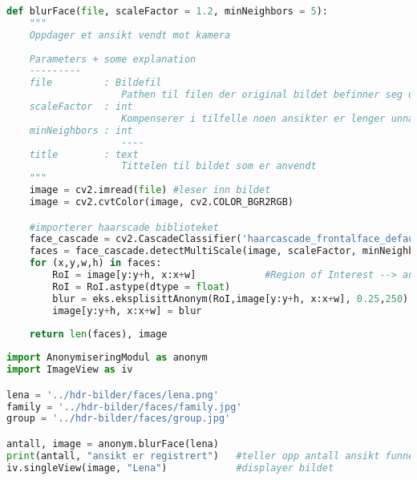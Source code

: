 \begin{lstlisting}[language=Python]
def blurFace(file, scaleFactor = 1.2, minNeighbors = 5):
    """
    Oppdager et ansikt vendt mot kamera
   
    Parameters + some explanation
    ---------
    file         : Bildefil
                    Pathen til filen der original bildet befinner seg uten andvending
    scaleFactor  : int
                    Kompenserer i tilfelle noen ansikter er lenger unna kamera enn andre
    minNeighbors : int
                    ----
    title        : text
                    Tittelen til bildet som er anvendt
    """
    image = cv2.imread(file) #leser inn bildet
    image = cv2.cvtColor(image, cv2.COLOR_BGR2RGB)

    #importerer haarscade biblioteket
    face_cascade = cv2.CascadeClassifier('haarcascade_frontalface_default.xml')  
    faces = face_cascade.detectMultiScale(image, scaleFactor, minNeighbors, minSize = (30,30))
    for (x,y,w,h) in faces:
        RoI = image[y:y+h, x:x+w]            #Region of Interest --> ansiktet
        RoI = RoI.astype(dtype = float)
        blur = eks.eksplisittAnonym(RoI,image[y:y+h, x:x+w], 0.25,250)               
        image[y:y+h, x:x+w] = blur
        
    return len(faces), image
    \end{lstlisting}

 
\begin{lstlisting}[language=Python]  
import AnonymiseringModul as anonym
import ImageView as iv

lena = '../hdr-bilder/faces/lena.png'
family = '../hdr-bilder/faces/family.jpg'
group = '../hdr-bilder/faces/group.jpg'

antall, image = anonym.blurFace(lena)
print(antall, "ansikt er registrert")   #teller opp antall ansikt funnet
iv.singleView(image, "Lena")            #displayer bildet
\end{lstlisting}


    